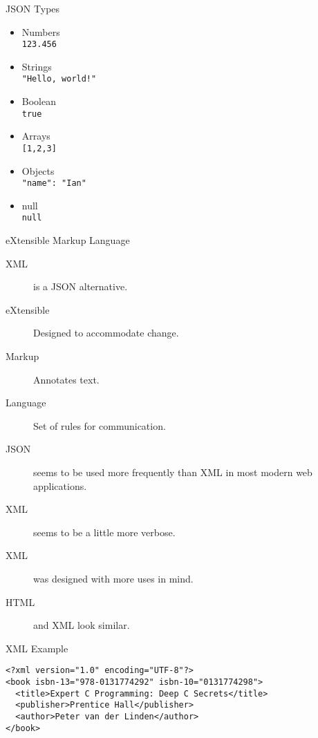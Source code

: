 \documentclass{beamer}
\begin{document}
\begin{frame}{JSON Types}
  \begin{itemize}
    \item Numbers \\
    \hspace{0.5cm} \texttt{123.456}
    \item Strings \\
    \hspace{0.5cm} \texttt{"Hello, world!"}
    \item Boolean \\
    \hspace{0.5cm} \texttt{true}
    \item Arrays\\
    \hspace{0.5cm} \texttt{[1,2,3]}
    \item Objects\\
    \hspace{0.5cm} \texttt{{"name": "Ian"}}
    \item null \\
    \hspace{0.5cm} \texttt{null}
  \end{itemize}
\end{frame}



\begin{frame}{eXtensible Markup Language}
  \begin{description}
    \item[XML] is a JSON alternative. 
    \item[eXtensible] Designed to accommodate change.
    \item[Markup] Annotates text.
    \item[Language] Set of rules for communication.
    \item[JSON] seems to be used more frequently than XML in most modern web applications.
    \item[XML] seems to be a little more verbose.
    \item[XML] was designed with more uses in mind.
    \item[HTML] and XML look similar.
  \end{description}
\end{frame}

\begin{frame}[fragile]{XML Example}
  \begin{verbatim}
<?xml version="1.0" encoding="UTF-8"?>
<book isbn-13="978-0131774292" isbn-10="0131774298">
  <title>Expert C Programming: Deep C Secrets</title>
  <publisher>Prentice Hall</publisher>
  <author>Peter van der Linden</author>
</book>
  \end{verbatim}
\end{frame}
\end{document}

